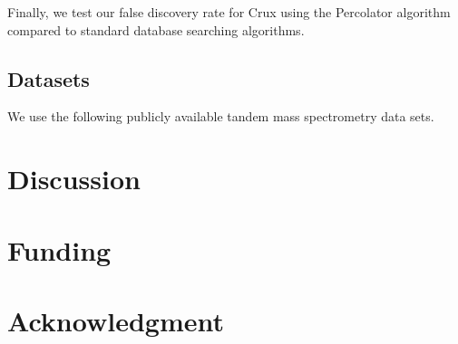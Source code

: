\documentclass{bioinfo}
\begin{document}
Finally, we test our false discovery rate for Crux using the
Percolator algorithm compared to standard database searching
algorithms.

\subsection*{Datasets}

We use the following publicly available tandem mass spectrometry data
sets.

\section{Discussion}



\section*{Funding}

\section*{Acknowledgment}







 
\end{document}
